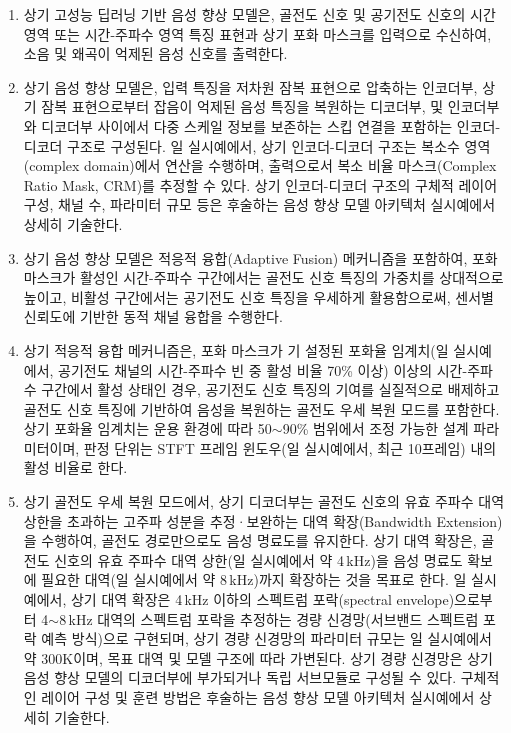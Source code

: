 \documentclass{article}
\begin{document}
\begin{enumerate}[label = \textbf{(B.2.\arabic*)}]

    \item 상기 고성능 딥러닝 기반 음성 향상 모델은, 골전도 신호 및
    공기전도 신호의 시간 영역 또는 시간-주파수 영역 특징 표현과 상기
    포화 마스크를 입력으로 수신하여, 소음 및 왜곡이 억제된 음성 신호를
    출력한다.

    \item 상기 음성 향상 모델은, 입력 특징을 저차원 잠복 표현으로
    압축하는 인코더부, 상기 잠복 표현으로부터 잡음이 억제된 음성 특징을
    복원하는 디코더부, 및 인코더부와 디코더부 사이에서 다중 스케일
    정보를 보존하는 스킵 연결을 포함하는 인코더-디코더 구조로 구성된다. 일 실시예에서, 상기 인코더-디코더 구조는 복소수 영역(complex domain)에서 연산을 수행하며, 출력으로서 복소 비율 마스크(Complex Ratio Mask, CRM)를 추정할 수 있다. 상기 인코더-디코더 구조의 구체적 레이어 구성, 채널 수, 파라미터 규모 등은 후술하는 음성 향상 모델 아키텍처 실시예에서 상세히 기술한다.

    \item 상기 음성 향상 모델은 적응적 융합(Adaptive Fusion) 메커니즘을
    포함하여, 포화 마스크가 활성인 시간-주파수 구간에서는 골전도 신호
    특징의 가중치를 상대적으로 높이고, 비활성 구간에서는 공기전도 신호
    특징을 우세하게 활용함으로써, 센서별 신뢰도에 기반한 동적 채널
    융합을 수행한다.

    \item 상기 적응적 융합 메커니즘은, 포화 마스크가 
    기 설정된 포화율 임계치(일 실시예에서, 공기전도 채널의 시간-주파수 빈 중 활성 비율 70\% 이상) 이상의 시간-주파수 구간에서 활성 상태인 
    경우, 공기전도 신호 특징의 기여를 실질적으로 
    배제하고 골전도 신호 특징에 기반하여 음성을 
    복원하는 골전도 우세 복원 모드를 포함한다. 상기 포화율 임계치는 운용 환경에 따라 50$\sim$90\% 범위에서 조정 가능한 설계 파라미터이며, 판정 단위는 STFT 프레임 윈도우(일 실시예에서, 최근 10프레임) 내의 활성 비율로 한다.

    \item 상기 골전도 우세 복원 모드에서, 상기 
    디코더부는 골전도 신호의 유효 주파수 대역 상한을 
    초과하는 고주파 성분을 추정·보완하는 
    대역 확장(Bandwidth Extension)을 수행하여, 골전도 
    경로만으로도 음성 명료도를 유지한다. 
    상기 대역 확장은, 골전도 신호의 유효 주파수 대역 상한(일 실시예에서 약 4\,kHz)을 음성 명료도 확보에 필요한 대역(일 실시예에서 약 8\,kHz)까지 확장하는 것을 목표로 한다. 일 실시예에서, 상기 대역 확장은 4\,kHz 이하의 스펙트럼 포락(spectral envelope)으로부터 4$\sim$8\,kHz 대역의 스펙트럼 포락을 추정하는 경량 신경망(서브밴드 스펙트럼 포락 예측 방식)으로 구현되며, 상기 경량 신경망의 파라미터 규모는 일 실시예에서 약 300K이며, 목표 대역 및 모델 구조에 따라 가변된다. 상기 경량 신경망은 상기 음성 향상 모델의 디코더부에 부가되거나 독립 서브모듈로 구성될 수 있다. 구체적인 레이어 구성 및 훈련 방법은 후술하는 음성 향상 모델 아키텍처 실시예에서 상세히 기술한다.



\end{enumerate}
\end{document}
